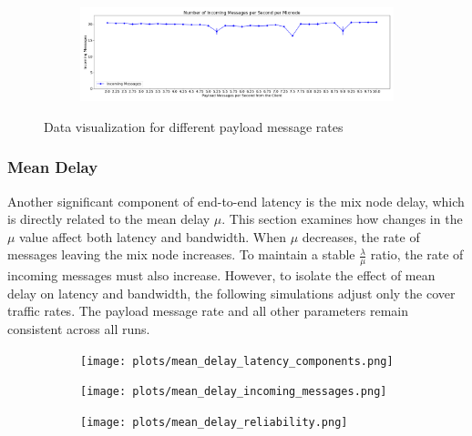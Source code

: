 \documentclass[a4paper,11pt,oneside]{report}
\begin{document}
\begin{figure}[H]
\begin{subfigure}{\textwidth}
        \centering
        \includegraphics[width=\textwidth]{plots/lambdas_incoming_messages.png}
        \caption{}
        \label{fig:lambdas_messages}
    \end{subfigure}
    \caption{Data visualization for different payload message rates}
\end{figure}

\subsubsection{Mean Delay}
Another significant component of end-to-end latency is the mix node delay, which is directly related to the mean delay \(\mu\). This section examines how changes in the \(\mu\) value affect both latency and bandwidth. When \(\mu\) decreases, the rate of messages leaving the mix node increases. To maintain a stable \(\frac{\lambda}{\mu}\) ratio, the rate of incoming messages must also increase. However, to isolate the effect of mean delay on latency and bandwidth, the following simulations adjust only the cover traffic rates. The payload message rate and all other parameters remain consistent across all runs.

\begin{figure}[H]
    \centering
    \begin{subfigure}{\textwidth}
        \centering
        \texttt{[image: plots/mean\_delay\_latency\_components.png]}
        \caption{}
        \label{fig:delays_latency}
    \end{subfigure}
    \hfill
    \centering
    \begin{subfigure}{\textwidth}
        \centering
        \texttt{[image: plots/mean\_delay\_incoming\_messages.png]}
        \caption{}
        \label{fig:delays_incoming}
    \end{subfigure}
    \hfill
    \begin{subfigure}{\textwidth}
        \centering
        \texttt{[image: plots/mean\_delay\_reliability.png]}
        \caption{}
        \label{fig:delays_reliability}
    \end{subfigure}
    \hfill
\end{figure}
\end{document}
